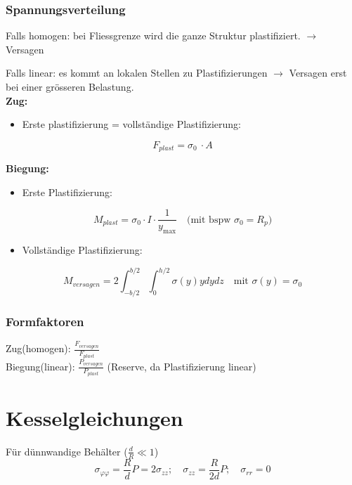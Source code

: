         \subsubsection{Spannungsverteilung}
            Falls homogen: bei Fliessgrenze wird die ganze Struktur plastifiziert. $\rightarrow$ Versagen %
              
            Falls linear: es kommt an lokalen Stellen zu Plastifizierungen $\rightarrow$ Versagen erst bei einer grösseren Belastung.\\
            \textbf{Zug:}
            \begin{itemize}
                \item Erste plastifizierung = vollständige Plastifizierung:
            \end{itemize}
            \[F_{plast} = \sigma_0\ \cdot A\]
            
            \columnbreak
            \textbf{Biegung:}
            \begin{itemize}
                \item Erste Plastifizierung:
            \end{itemize}
            \[M_{plast} = \sigma_0\cdot I\cdot\frac{1}{y_{\textrm{max}}} \quad\textrm{(mit bspw $\sigma_0 = R_p$)}\]
            \begin{itemize}
                \item Vollständige Plastifizierung:
            \end{itemize}
            \[M_{versagen} = 2\int_{-b/2}^{b/2}\int_{0}^{h/2}\sigma(y)ydydz \quad\textrm{mit $\sigma(y) = \sigma_0$}\]
        \subsubsection{Formfaktoren}
            Zug(homogen): $\frac{F_{versagen}}{F_{plast}}$\\
            Biegung(linear): $\frac{P_{versagen}}{P_{plast}}$ (Reserve, da Plastifizierung linear)
    \section{Kesselgleichungen}
        Für dünnwandige Behälter ($\frac{d}{R} \ll 1$)
        \vspace{-3mm}
        \[\sigma_{\varphi\varphi} = \frac{R}{d}P = 2\sigma_{zz}; \quad \sigma_{zz} = \frac{R}{2d}P; \quad \sigma_{rr}=0\]
            